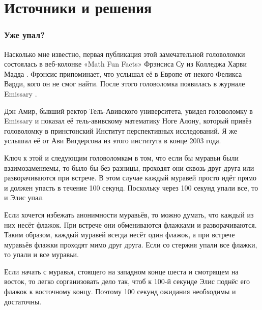 \section*{Источники и решения}

\subsubsection*{Уже упал?}

Насколько мне известно, первая публикация этой замечательной головоломки состоялась в веб-колонке «Math Fun Facts» Фрэнсиса Су из Колледжа Харви Мадда \cite{math-fun-facts}.
Фрэнсис припоминает, что услышал её в Европе от некого Феликса Варди, кого он не смог найти.
После этого головоломка появилась в журнале Emissary \cite[Весна/Осень 2003]{3}.

Дэн Амир, бывший ректор Тель-Авивского университета, увидел головоломку в Emissary и показал её тель-авивскому математику Ноге Алону, который привёз головоломку в принстонский Институт перспективных исследований.
Я же услышал её от Ави Вигдерсона из этого института в конце 2003 года.

Ключ к этой и следующим головоломкам в том, что если бы муравьи были взаимозаменяемы, то было бы без разницы, проходят они сквозь друг друга или разворачиваются при встрече.
В этом случае каждый муравей просто идёт прямо и должен упасть в течение 100 секунд.
Поскольку через 100 секунд упали все, то и Элис упал.

Если хочется избежать анонимности муравьёв, то можно думать, что каждый из них несёт флажок.
При встрече они обмениваются флажками и разворачиваются.
Таким образом, каждый муравей всегда несёт один флажок, а при встрече муравьёв флажки проходят мимо друг друга.
Если со стержня упали все флажки, то упали и все муравьи.

Если начать с муравья, стоящего на западном конце шеста и смотрящем на восток, то легко сорганизовать дело так, чтоб к 100-й секунде Элис поднёс его флажок к восточному концу.
Поэтому 100 секунд ожидания необходимы и достаточны.

